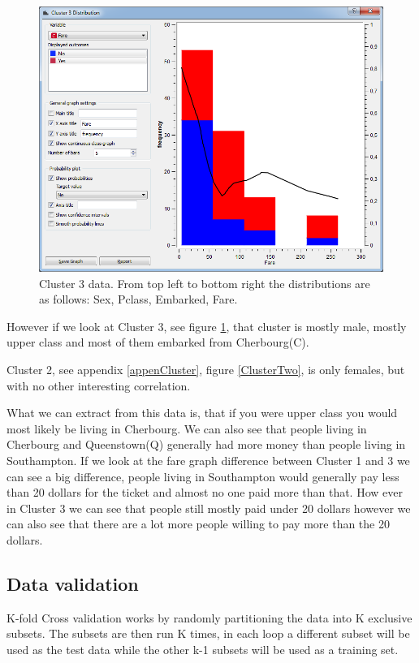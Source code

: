 \documentclass[a4paper,11pt]{article}
\begin{document}
\begin{figure}[h]
\begin{center}
		\includegraphics[scale=0.25]{ClusterDistribution/Cluster3/Fare}
	\end{center}
	\caption{Cluster 3 data. From top left to bottom right the distributions are as follows: Sex, Pclass, Embarked, Fare.}
	\label{ClusterThree}
\end{figure}


However if we look at Cluster 3, see figure \ref{ClusterThree}, that cluster is mostly male, mostly upper class and most of them embarked from Cherbourg(C).

Cluster 2, see appendix \ref{appenCluster}, figure \ref{ClusterTwo}, is only females, but with no other interesting correlation.

What we can extract from this data is, that if you were upper class you would most likely be living in Cherbourg.
We can also see that people living in Cherbourg and Queenstown(Q) generally had more money than people living in Southampton. If we look at the fare graph difference between Cluster 1 and 3 we can see a big difference, people living in Southampton would generally pay less than 20 dollars for the ticket and almost no one paid more than that. How ever in Cluster 3 we can see that people still mostly paid under 20 dollars however we can also see that there are a lot more people willing to pay more than the 20 dollars.

\subsection{Data validation}
K-fold Cross validation \cite[p.370]{DataMinBook} works by randomly partitioning the data into K exclusive subsets. The subsets are then run K times, in each loop a different subset will be used as the test data while the other k-1 subsets will be used as a training set.
\end{document}
